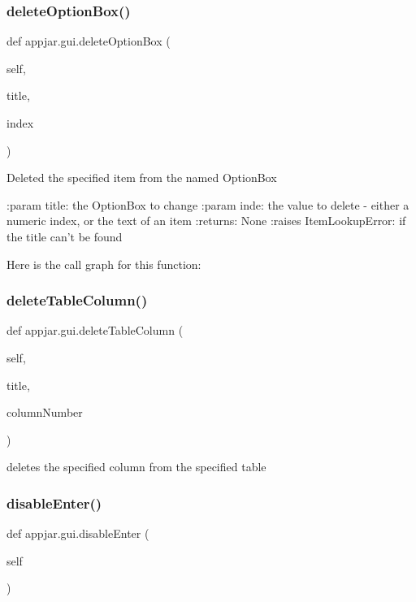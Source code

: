 \subsubsection{\texorpdfstring{delete\+Option\+Box()}{deleteOptionBox()}}
{\footnotesize\ttfamily def appjar.\+gui.\+delete\+Option\+Box (\begin{DoxyParamCaption}\item[{}]{self,  }\item[{}]{title,  }\item[{}]{index }\end{DoxyParamCaption})}

\begin{DoxyVerb}Deleted the specified item from the named OptionBox

:param title: the OptionBox to change
:param inde: the value to delete - either a numeric index, or the text of an item
:returns: None
:raises ItemLookupError: if the title can't be found
\end{DoxyVerb}
 Here is the call graph for this function\+:
\mbox{\label{classappjar_1_1gui_abd57b7566a5ba0cb985a990f04798fa9}} 
\subsubsection{\texorpdfstring{delete\+Table\+Column()}{deleteTableColumn()}}
{\footnotesize\ttfamily def appjar.\+gui.\+delete\+Table\+Column (\begin{DoxyParamCaption}\item[{}]{self,  }\item[{}]{title,  }\item[{}]{column\+Number }\end{DoxyParamCaption})}

\begin{DoxyVerb}deletes the specified column from the specified table \end{DoxyVerb}
 \mbox{\label{classappjar_1_1gui_a656242f92aa0e2e5309d0d5937375ecc}} 
\subsubsection{\texorpdfstring{disable\+Enter()}{disableEnter()}}
{\footnotesize\ttfamily def appjar.\+gui.\+disable\+Enter (\begin{DoxyParamCaption}\item[{}]{self }\end{DoxyParamCaption})}

